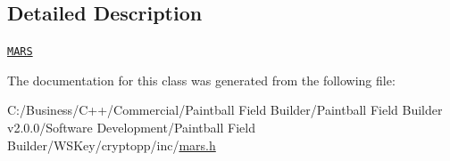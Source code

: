\subsection{Detailed Description}
\href{http://www.weidai.com/scan-mirror/cs.html#MARS}{\tt MARS} 

The documentation for this class was generated from the following file:\begin{DoxyCompactItemize}
\item 
C:/Business/C++/Commercial/Paintball Field Builder/Paintball Field Builder v2.0.0/Software Development/Paintball Field Builder/WSKey/cryptopp/inc/\hyperlink{mars_8h}{mars.h}\end{DoxyCompactItemize}
